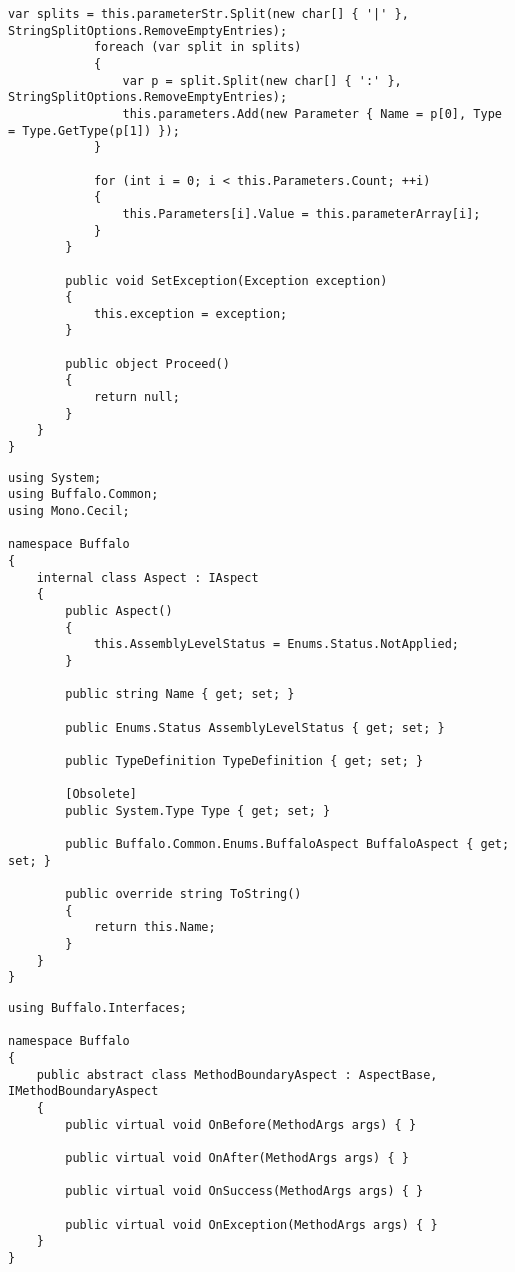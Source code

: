 \begin{lstlisting}[caption={../buffalo/MethodArgs.cs}, label=../buffalo/MethodArgs.cs, frame=tb, basicstyle=\scriptsize]
            var splits = this.parameterStr.Split(new char[] { '|' }, StringSplitOptions.RemoveEmptyEntries);
            foreach (var split in splits)
            {
                var p = split.Split(new char[] { ':' }, StringSplitOptions.RemoveEmptyEntries);
                this.parameters.Add(new Parameter { Name = p[0], Type = Type.GetType(p[1]) });
            }

            for (int i = 0; i < this.Parameters.Count; ++i)
            {
                this.Parameters[i].Value = this.parameterArray[i];
            }
        }

        public void SetException(Exception exception)
        {
            this.exception = exception;
        }

        public object Proceed()
        {
            return null;
        }
    }
}
\end{lstlisting}

\begin{lstlisting}[caption={../buffalo/Aspect.cs}, label=../buffalo/Aspect.cs, frame=tb, basicstyle=\scriptsize]﻿using System;
using Buffalo.Common;
using Mono.Cecil;

namespace Buffalo
{
    internal class Aspect : IAspect
    {
        public Aspect()
        {
            this.AssemblyLevelStatus = Enums.Status.NotApplied;
        }

        public string Name { get; set; }

        public Enums.Status AssemblyLevelStatus { get; set; }

        public TypeDefinition TypeDefinition { get; set; }

        [Obsolete]
        public System.Type Type { get; set; }

        public Buffalo.Common.Enums.BuffaloAspect BuffaloAspect { get; set; }

        public override string ToString()
        {
            return this.Name;
        }
    }
}
\end{lstlisting}

\begin{lstlisting}[caption={../buffalo/MethodBoundaryAspect.cs}, label=../buffalo/MethodBoundaryAspect.cs, frame=tb, basicstyle=\scriptsize]﻿using Buffalo.Interfaces;

namespace Buffalo
{
    public abstract class MethodBoundaryAspect : AspectBase, IMethodBoundaryAspect
    {
        public virtual void OnBefore(MethodArgs args) { }

        public virtual void OnAfter(MethodArgs args) { }

        public virtual void OnSuccess(MethodArgs args) { }

        public virtual void OnException(MethodArgs args) { }
    }
}
\end{lstlisting}

